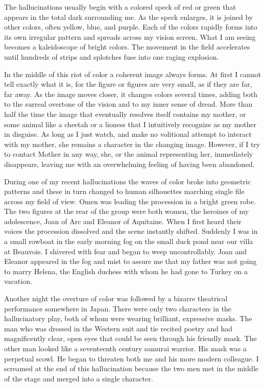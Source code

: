 \documentclass[]{article}
\begin{document}
The hallucinations usually begin with a colored speck of red or green that appears in the total dark surrounding me.  As the speck enlarges, it is joined by other colors, often yellow, blue, and purple.  Each of the colors rapidly forms into its own irregular pattern and spreads across my vision screen.  What I am seeing becomes a kaleidoscope of bright colors.  The movement in the field accelerates until hundreds of strips and splotches fuse into one raging explosion.

In the middle of this riot of color a coherent image always forms.  At first I cannot tell exactly what it is, for the figure or figures are very small, as if they are far, far away.  As the image moves closer, it changes colors several times, adding both to the surreal overtone of the vision and to my inner sense of dread.  More than half the time the image that eventually resolves itself contains my mother, or some animal like a cheetah or a lioness that I intuitively recognize as my mother in disguise.  As long as I just watch, and make no volitional attempt to interact with my mother, she remains a character in the changing image.  However, if I try to contact Mother in any way, she, or the animal representing her, immediately disappears, leaving me with an overwhelming feeling of having been abandoned.

During one of my recent hallucinations the waves of color broke into geometric patterns and these in turn changed to human silhouettes marching single file across my field of view.  Omen was leading the procession in a bright green robe.  The two figures at the rear of the group were both women, the heroines of my adolescence, Joan of Arc and Eleanor of Aquitaine.  When I first heard their voices the procession dissolved and the scene instantly shifted.  Suddenly I was in a small rowboat in the early morning fog on the small duck pond near our villa at Beauvois.  I shivered with fear and began to weep uncontrollably.  Joan and Eleanor appeared in the fog and mist to assure me that my father was not going to marry Helena, the English duchess with whom he had gone to Turkey on a vacation.

Another night the overture of color was followed by a bizarre theatrical performance somewhere in Japan.  There were only two characters in the hallucinatory play, both of whom were wearing brilliant, expressive masks.  The man who was dressed in the Western suit and tie recited poetry and had magnificently clear, open eyes that could be seen through his friendly mask.  The other man looked like a seventeenth century samurai warrior.  His mask was a perpetual scowl.  He began to threaten both me and his more modern colleague.  I screamed at the end of this hallucination because the two men met in the middle of the stage and merged into a single character.
\end{document}
